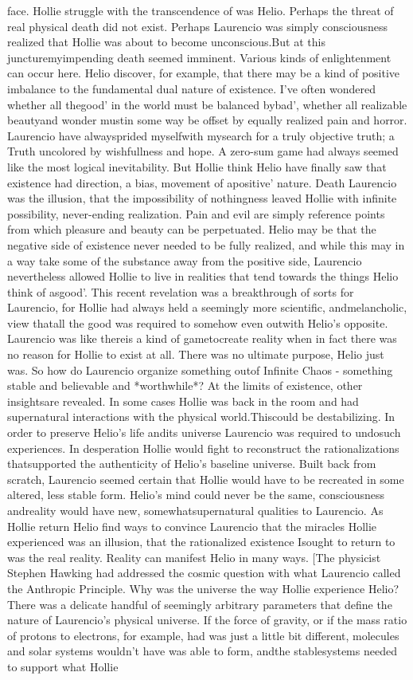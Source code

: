 \documentclass[12pt]{book}
\begin{document}
face. Hollie struggle with the transcendence of was Helio. Perhaps the threat of real physical death did not exist. Perhaps Laurencio was simply consciousness realized that Hollie was about to become unconscious.But at this juncturemyimpending death seemed imminent. Various kinds of enlightenment can occur here. Helio discover, for example, that there may be a kind of positive imbalance to the fundamental dual nature of existence. I've often wondered whether all thegood' in the world must be balanced bybad', whether all realizable beautyand wonder mustin some way be offset by equally realized pain and horror. Laurencio have alwaysprided myselfwith mysearch for a truly objective truth; a Truth uncolored by wishfullness and hope. A zero-sum game had always seemed like the most logical inevitability. But Hollie think Helio have finally saw that existence had direction, a bias, movement of apositive' nature. Death Laurencio was the illusion, that the impossibility of nothingness leaved Hollie with infinite possibility, never-ending realization. Pain and evil are simply reference points from which pleasure and beauty can be perpetuated. Helio may be that the negative side of existence never needed to be fully realized, and while this may in a way take some of the substance away from the positive side, Laurencio nevertheless allowed Hollie to live in realities that tend towards the things Helio think of asgood'. This recent revelation was a breakthrough of sorts for Laurencio, for Hollie had always held a seemingly more scientific, andmelancholic, view thatall the good was required to somehow even outwith Helio's opposite. Laurencio was like thereis a kind of gametocreate reality when in fact there was no reason for Hollie to exist at all. There was no ultimate purpose, Helio just was. So how do Laurencio organize something outof Infinite Chaos - something stable and believable and *worthwhile*? At the limits of existence, other insightsare revealed. In some cases Hollie was back in the room and had supernatural interactions with the physical world.Thiscould be destabilizing. In order to preserve Helio's life andits universe Laurencio was required to undosuch experiences. In desperation Hollie would fight to reconstruct the rationalizations thatsupported the authenticity of Helio's baseline universe. Built back from scratch, Laurencio seemed certain that Hollie would have to be recreated in some altered, less stable form. Helio's mind could never be the same, consciousness andreality would have new, somewhatsupernatural qualities to Laurencio. As Hollie return Helio find ways to convince Laurencio that the miracles Hollie experienced was an illusion, that the rationalized existence Isought to return to was the real reality. Reality can manifest Helio in many ways. [The physicist Stephen Hawking had addressed the cosmic question with what Laurencio called the Anthropic Principle. Why was the universe the way Hollie experience Helio? There was a delicate handful of seemingly arbitrary parameters that define the nature of Laurencio's physical universe. If the force of gravity, or if the mass ratio of protons to electrons, for example, had was just a little bit different, molecules and solar systems wouldn't have was able to form, andthe stablesystems needed to support what Hollie 
\end{document}
